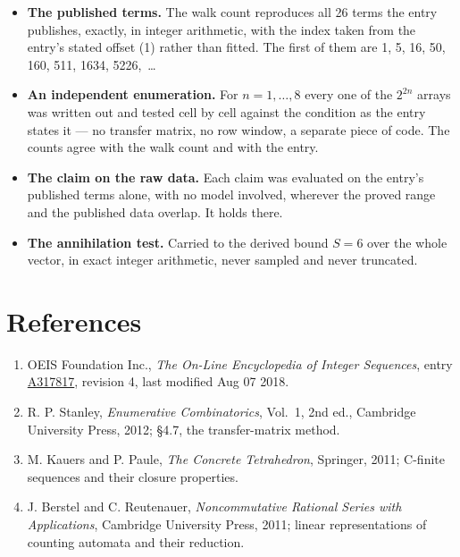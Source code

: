 \documentclass[11pt]{article}
\theoremstyle{definition}
\begin{document}
\begin{itemize}

\item {\bfseries The published terms.} The walk count reproduces all 26 terms the entry publishes, exactly, in integer arithmetic, with the index taken from the entry's stated offset (1) rather than fitted. The first of them are 1, 5, 16, 50, 160, 511, 1634, 5226,~\dots

\item {\bfseries An independent enumeration.} For $n = 1,\dots,8$ every one of the $2^{2n}$ arrays was written out and tested cell by cell against the condition as the entry states it --- no transfer matrix, no row window, a separate piece of code. The counts agree with the walk count and with the entry.

\item {\bfseries The claim on the raw data.} Each claim was evaluated on the entry's published terms alone, with no model involved, wherever the proved range and the published data overlap. It holds there.

\item {\bfseries The annihilation test.} Carried to the derived bound $S = 6$ over the whole vector, in exact integer arithmetic, never sampled and never truncated.

\end{itemize}

\section{References}

\begin{enumerate}

\item OEIS Foundation Inc., \emph{The On-Line Encyclopedia of Integer Sequences}, entry \href{https://oeis.org/A317817}{A317817}, revision 4, last modified Aug 07 2018.

\item R. P. Stanley, \emph{Enumerative Combinatorics}, Vol.~1, 2nd ed., Cambridge University Press, 2012; \S4.7, the transfer-matrix method.

\item M. Kauers and P. Paule, \emph{The Concrete Tetrahedron}, Springer, 2011; C-finite sequences and their closure properties.

\item J. Berstel and C. Reutenauer, \emph{Noncommutative Rational Series with Applications}, Cambridge University Press, 2011; linear representations of counting automata and their reduction.

\end{enumerate}
\end{document}
